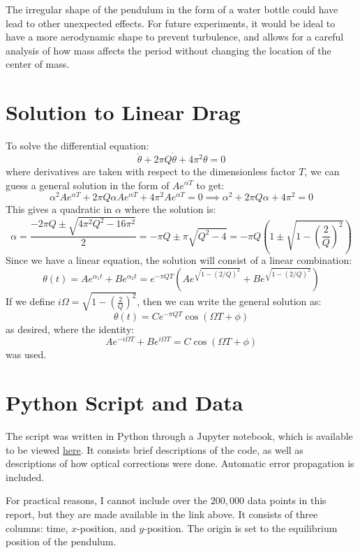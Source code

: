 \documentclass[%
 reprint,
 amsmath,amssymb
 aps,
]{revtex4-2}
\begin{document}
The irregular shape of the pendulum in the form of a water bottle could have lead to other unexpected effects. For future experiments, it would be ideal to have a more aerodynamic shape to prevent turbulence, and allows for a careful analysis of how mass affects the period without changing the location of the center of mass.
\onecolumngrid


\newpage
\appendix
\section{Solution to Linear Drag}
\noindent To solve the differential equation:
\begin{equation}
    \ddot{\theta}+2\pi Q\dot{\theta}+4\pi^2\theta=0
    \label{eq:}
\end{equation}
where derivatives are taken with respect to the dimensionless factor $T$, we can guess a general solution in the form of $Ae^{\alpha T}$ to get:
\begin{equation}
    \alpha^2Ae^{\alpha T}+2\pi Q\alpha Ae^{\alpha T}+4\pi^2Ae^{\alpha T}=0 \implies \alpha^2+2\pi Q\alpha+4\pi^2 = 0
    \label{eq:}
\end{equation}
This gives a quadratic in $\alpha$ where the solution is:
\begin{equation}
    \alpha = \frac{-2\pi Q \pm \sqrt{4\pi^2Q^2-16\pi^2}}{2}= -\pi Q\pm \pi\sqrt{Q^2-4}=-\pi Q\left(1\pm\sqrt{1-\left(\frac{2}{Q}\right)^2}\right)
    \label{eq:}
\end{equation}
Since we have a linear equation, the solution will consist of a linear combination:
\begin{equation}
    \theta(t)=Ae^{\alpha_1t}+Be^{\alpha_2t}=e^{-\pi Q T}\left(Ae^{\sqrt{1-(2/Q)^2}}+Be^{\sqrt{1-(2/Q)^2}}\right)
    \label{eq:}
\end{equation}
If we define $i\Omega=\sqrt{1-\left(\frac{2}{Q}\right)^2}$, then we can write the general solution as:
\begin{equation}
    \theta(t)=Ce^{-\pi QT}\cos\left(\Omega T+\phi\right)
    \label{eq:}
\end{equation}
as desired, where the identity:
\begin{equation}
    Ae^{-i\Omega T}+Be^{i\Omega T}=C\cos\left(\Omega T+\phi\right)
    \label{eq:}
\end{equation}
was used.
\section{Python Script and Data}
The script was written in Python through a Jupyter notebook, which is available to be viewed \href{https://github.com/QiLinXue/pendulum-labs}{here}. It consists brief descriptions of the code, as well as descriptions of how optical corrections were done. Automatic error propagation is included.

For practical reasons, I cannot include over the $200,000$ data points in this report, but they are made available in the link above. It consists of three columns: time, $x$-position, and $y$-position. The origin is set to the equilibrium position of the pendulum.
\end{document}
